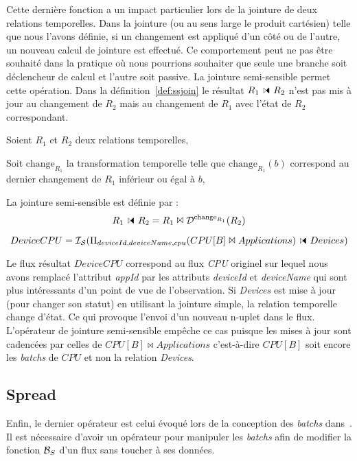 Cette dernière fonction a un impact particulier lors de la jointure de deux relations temporelles. Dans la jointure (ou au sens large le produit cartésien) telle que nous l'avons définie, si un changement est appliqué d'un côté ou de l'autre, un nouveau calcul de jointure est effectué. Ce comportement peut ne pas être souhaité dans la pratique où nous pourrions souhaiter que seule une branche soit déclencheur de calcul et l'autre soit passive. La jointure semi-sensible permet cette opération. Dans la définition~\ref{def:ssjoin} le résultat $R_1 \ssjoin R_2$ n'est pas mis à jour au changement de $R_2$ mais au changement de $R_1$ avec l'état de $R_2$ correspondant.

\begin{defi}\label{def:ssjoin}
    Soient $R_1$ et $R_2$ deux relations temporelles,

    Soit $\mathrm{change}_{R_1}$ la transformation temporelle telle que $\mathrm{change}_{R_1}(b)$ correspond au dernier changement de $R_1$ inférieur ou égal à $b$,

    La jointure semi-sensible est définie par :
        $$R_1\ssjoin R_2 = R_1 \Join \D^{\mathrm{change}_{R_1}}(R_2)$$
\end{defi}
\begin{example}
    $$DeviceCPU=\IS(\Pi_{deviceId,deviceName,cpu}(CPU[B]\Join Applications)\ssjoin Devices)$$

Le flux résultat $DeviceCPU$ correspond au flux \textit{CPU} originel sur lequel nous avons remplacé l'attribut \textit{appId} par les attributs \textit{deviceId} et \textit{deviceName} qui sont plus intéressants d'un point de vue de l'observation. Si \textit{Devices} est mise à jour (pour changer son statut) en utilisant la jointure simple, la relation temporelle change d'état. Ce qui provoque l'envoi d'un nouveau n-uplet dans le flux. L'opérateur de jointure semi-sensible empêche ce cas puisque les mises à jour sont cadencées par celles de $CPU[B]\Join Applications$ c'est-à-dire $CPU[B]$ soit encore les \textit{batchs} de $CPU$ et non la relation \textit{Devices}.
\end{example}

\subsection{Spread}
Enfin, le dernier opérateur est celui évoqué lors de la conception des \textit{batchs} dans~\cite{Jain:spread}. Il est nécessaire d'avoir un opérateur pour manipuler les \textit{batchs} afin de modifier la fonction $\mathcal{B}_S$ d'un flux sans toucher à ses données.

